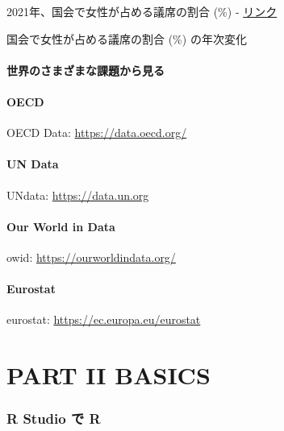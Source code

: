 \documentclass[
]{bxjsbook}
\theoremstyle{definition}
\theoremstyle{definition}
\theoremstyle{definition}
\theoremstyle{definition}
\theoremstyle{remark}
\begin{document}
2021年、国会で女性が占める議席の割合 (\%) - \href{https://data.worldbank.org/indicator/SG.GEN.PARL.ZS?locations=JP-GB-RU-FR-CN-US-UA-DE\&start=2021\&end=2021\&view=bar}{リンク}

国会で女性が占める議席の割合 (\%) の年次変化

\hypertarget{ux4e16ux754cux306eux3055ux307eux3056ux307eux306aux8ab2ux984cux304bux3089ux898bux308b}{%
\subsection{世界のさまざまな課題から見る}\label{ux4e16ux754cux306eux3055ux307eux3056ux307eux306aux8ab2ux984cux304bux3089ux898bux308b}}

\hypertarget{oecd}{%
\subsection{OECD}\label{oecd}}

OECD Data: \url{https://data.oecd.org/}

\hypertarget{un-data}{%
\subsection{UN Data}\label{un-data}}

UNdata: \url{https://data.un.org}

\hypertarget{our-world-in-data}{%
\subsection{Our World in Data}\label{our-world-in-data}}

owid: \url{https://ourworldindata.org/}

\hypertarget{eurostat}{%
\subsection{Eurostat}\label{eurostat}}

eurostat: \url{https://ec.europa.eu/eurostat}

\hypertarget{part-part-ii-basics}{%
\part{PART II BASICS}\label{part-part-ii-basics}}

\hypertarget{ronrstudio}{%
\section{R Studio で R}\label{ronrstudio}}
\end{document}

